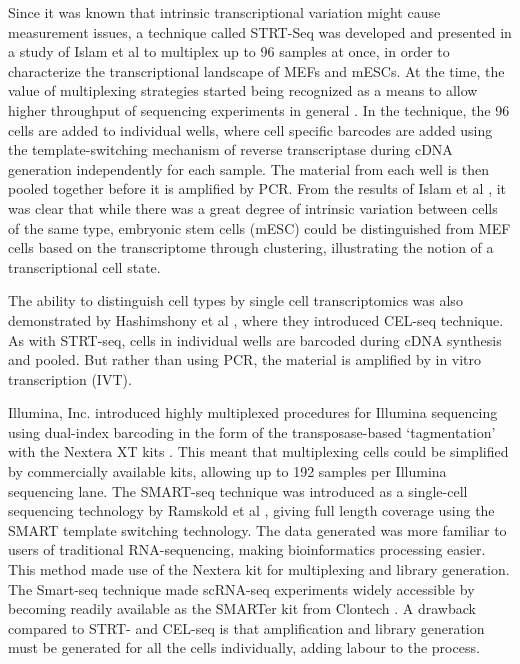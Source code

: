 Since it was known that intrinsic transcriptional variation might cause measurement issues, a
technique called STRT-Seq was developed and presented in a study of Islam et al \cite{Islam2011-yy} to
multiplex up to 96 samples at once, in order to characterize the transcriptional landscape of
MEFs and mESCs. At the time, the value of multiplexing strategies started being recognized
as a means to allow higher throughput of sequencing experiments in general
 \cite{Kozarewa2011-we}. In the technique, the 96 cells are added to individual wells, where cell specific barcodes are added using the template-switching mechanism of reverse transcriptase during cDNA generation
independently for each sample. The material from each well is then pooled together before it
is amplified by PCR. From the results of Islam et al \cite{Islam2011-yy}, it was clear that while there was a great degree of intrinsic variation between cells of the same type, embryonic stem cells (mESC) could be distinguished from MEF cells based on the transcriptome through clustering, illustrating the notion of a transcriptional cell state.

The ability to distinguish cell types by single cell transcriptomics was also demonstrated by
Hashimshony et al \cite{Hashimshony2012-am}, where they introduced CEL-seq technique. As with STRT-seq, cells in
individual wells are barcoded during cDNA synthesis and pooled. But rather than using PCR,
the material is amplified by in vitro transcription (IVT).

Illumina, Inc. introduced highly multiplexed procedures for Illumina sequencing using
dual-index barcoding in the form of the transposase-based ‘tagmentation’ with the Nextera
XT kits \cite{Illumina_Inc2012-mf}. This meant that multiplexing cells could be simplified by commercially available kits, allowing up to 192 samples per Illumina sequencing lane. The SMART-seq technique
was introduced as a single-cell sequencing technology by Ramskold et al \cite{Ramskold2012-zc}, giving full length coverage using the SMART template switching technology. The data generated was more
familiar to users of traditional RNA-sequencing, making bioinformatics processing easier.
This method made use of the Nextera kit for multiplexing and library generation. The
Smart-seq technique made scRNA-seq experiments widely accessible by becoming readily available as the SMARTer kit from Clontech \cite{Clontech_Laboratories_Inc2013-zf}. A drawback compared to STRT- and CEL-seq
is that amplification and library generation must be generated for all the cells individually,
adding labour to the process.

